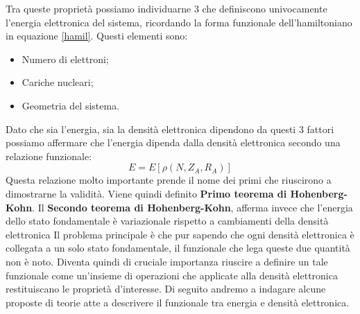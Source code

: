 \documentclass[oneside]{amsbook}
\numberwithin{section}{chapter}
\numberwithin{equation}{section}
\numberwithin{figure}{section}
\begin{document}
Tra queste proprietà possiamo individuarne $3$ che definiscono univocamente l'energia elettronica del sistema, ricordando la forma funzionale dell'hamiltoniano in equazione \ref{hamil}. Questi elementi sono:
\begin{itemize}
\item Numero di elettroni;
\item Cariche nucleari;
\item Geometria del sistema.
\end{itemize}
Dato che sia l'energia, sia la densità elettronica dipendono da questi $3$ fattori possiamo affermare che l'energia dipenda dalla densità elettronica secondo una relazione funzionale:
\begin{equation}
E=E[\rho(N,Z_A,R_A)]
\end{equation}
Questa relazione molto importante prende il nome dei primi che riuscirono a dimostrarne la validità. Viene quindi definito \textbf{Primo teorema di Hohenberg-Kohn}.
Il \textbf{Secondo teorema di Hohenberg-Kohn}, afferma invece che l'energia dello stato fondamentale è variazionale rispetto a cambiamenti della densità elettronica
Il problema principale è che pur sapendo che ogni densità elettronica è collegata a un solo stato fondamentale, il funzionale che lega queste due quantità non è noto.  Diventa 	quindi di cruciale importanza riuscire a definire un tale funzionale come un'insieme di operazioni che applicate alla densità elettronica restituiscano le proprietà d'interesse.
Di seguito andremo a indagare alcune proposte di teorie atte a descrivere il funzionale tra energia e densità elettronica.
\end{document}
